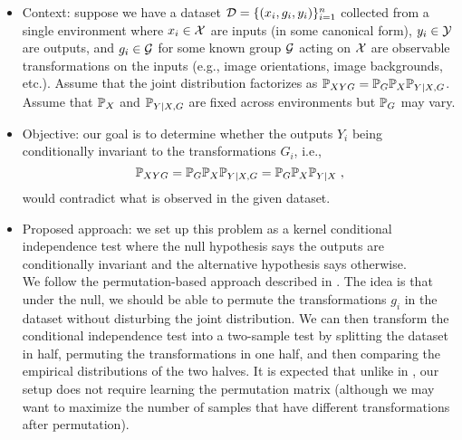 \begin{itemize}

\item
Context: suppose we have a dataset $\mathcal{D}=\{(x_i,g_i,y_i)\}_{i=1}^n$ collected from a single environment where $x_i\in\mathcal{X}$ are inputs (in some canonical form), $y_i\in\mathcal{Y}$ are outputs, and $g_i\in\mathcal{G}$ for some known group $\mathcal{G}$ acting on $\mathcal{X}$ are observable transformations on the inputs (e.g., image orientations, image backgrounds, etc.). Assume that the joint distribution factorizes as $\mathbb{P}_{XYG}=\mathbb{P}_G\mathbb{P}_X\mathbb{P}_{Y|X,G}$. Assume that $\mathbb{P}_X$ and $\mathbb{P}_{Y|X,G}$ are fixed across environments but $\mathbb{P}_G$ may vary.

\item
Objective: our goal is to determine whether the outputs $Y_i$ being conditionally invariant to the transformations $G_i$, i.e.,
\[
\mathbb{P}_{XYG}=\mathbb{P}_G\mathbb{P}_X\mathbb{P}_{Y|X,G} = \mathbb{P}_G\mathbb{P}_X\mathbb{P}_{Y|X}\;,
\]
would contradict what is observed in the given dataset.

\item
Proposed approach: we set up this problem as a kernel conditional independence test where the null hypothesis says the outputs are conditionally invariant and the alternative hypothesis says otherwise.
\\

We follow the permutation-based approach described in \parencite{Doran:2014}. The idea is that under the null, we should be able to permute the transformations $g_i$ in the dataset without disturbing the joint distribution. We can then transform the conditional independence test into a two-sample test by splitting the dataset in half, permuting the transformations in one half, and then comparing the empirical distributions of the two halves. It is expected that unlike in \parencite{Doran:2014}, our setup does not require learning the permutation matrix (although we may want to maximize the number of samples that have different transformations after permutation).
\\


\end{itemize}
